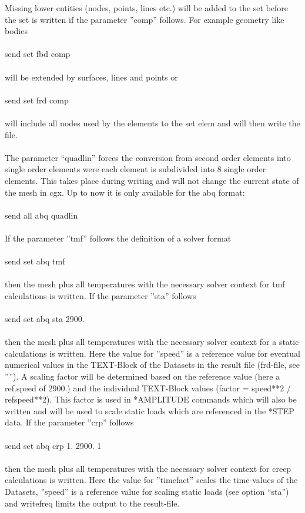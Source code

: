 \documentclass{article}
\begin{document}
Missing lower entities (nodes, points, lines etc.)  will be added to the set before the set is written if the parameter ''comp'' follows. For example geometry like bodies\\\\send set fbd comp\\\\will be extended by surfaces, lines and points or\\\\send set frd comp\\\\will include all nodes used by the elements to the set elem and will then write the file.\\\\
The parameter ``quadlin'' forces the conversion from second order elements into single order elements were each element is subdivided into 8 single order elements. This takes place during writing and will not change the current state of the mesh in cgx. Up to now it is only available for the abq format:\\\\send all abq quadlin\\\\
If the parameter ''tmf'' follows the definition of a solver format\\\\send set abq tmf\\\\then the mesh plus all temperatures with the necessary solver context for tmf calculations is written. If the parameter ''sta'' follows \\\\send set abq sta 2900.\\\\then the mesh plus all temperatures with the necessary solver context for a static calculations is written. Here the value for ''speed'' is a reference value for eventual numerical values in the TEXT-Block of the Datasets in the result file (frd-file, see ''''). A scaling factor will be determined based on the reference value (here a ref.speed of 2900.) and the individual TEXT-Block values (factor = speed**2 / refspeed**2). This factor is used in *AMPLITUDE commands which will also be written and will be used to scale static loads which are referenced in the *STEP data. If the parameter ''crp'' follows \\\\send set abq crp 1. 2900. 1\\\\then the mesh plus all temperatures with the necessary solver context for creep calculations is written. Here the value for ''timefact'' scales the time-values of the Datasets, ''speed'' is a reference value for scaling static loads (see option ``sta'') and writefreq limits the output to the result-file.\\\\
\end{document}
